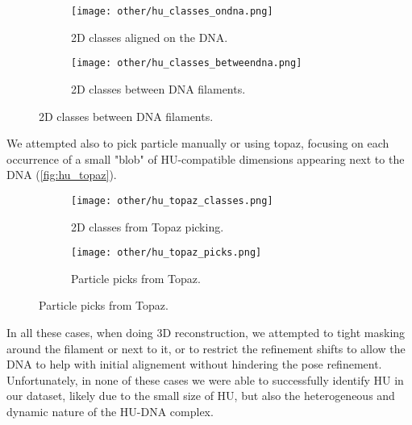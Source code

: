 \begin{figure}[ht]
    \centering
    \begin{subfigure}[B]{.49\textwidth}
        \centering
        \texttt{[image: other/hu\_classes\_ondna.png]}
        \caption{2D classes aligned on the DNA.}
        \label{fig:hu_classes_ondna}
    \end{subfigure}%
    \hfill
    \begin{subfigure}[B]{.49\textwidth}
        \centering
        \texttt{[image: other/hu\_classes\_betweendna.png]}
        \caption{2D classes between DNA filaments.}
        \label{fig:hu_classes_betweendna}
    \end{subfigure}%
    \label{fig:hu_classes}
\end{figure}

We attempted also to pick particle manually or using topaz, focusing on each occurrence of a small "blob" of HU-compatible dimensions appearing next to the DNA (\autoref{fig:hu_topaz}).

\begin{figure}[ht]
    \centering
    \begin{subfigure}[B]{.5\textwidth}
        \centering
        \texttt{[image: other/hu\_topaz\_classes.png]}
        \caption{2D classes from Topaz picking.}
        \label{fig:hu_topaz_classes}
    \end{subfigure}%
    \hfill
    \begin{subfigure}[B]{.5\textwidth}
        \centering
        \texttt{[image: other/hu\_topaz\_picks.png]}
        \caption{Particle picks from Topaz.}
        \label{fig:hu_topaz_picks}
    \end{subfigure}%
    \label{fig:hu_topaz}
\end{figure}

In all these cases, when doing 3D reconstruction, we attempted to tight masking around the filament or next to it, or to restrict the refinement shifts to allow the DNA to help with initial alignement without hindering the pose refinement.
Unfortunately, in none of these cases we were able to successfully identify HU in our dataset, likely due to the small size of HU, but also the heterogeneous and dynamic nature of the HU-DNA complex.


